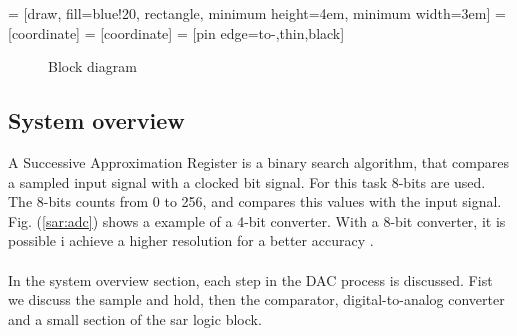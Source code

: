 \documentclass[english, 12pt, a4paper]{article}
\begin{document}
 = [draw, fill=blue!20, rectangle, 
    minimum height=4em, minimum width=3em]
 = [coordinate]
 = [coordinate]
 = [pin edge={to-,thin,black}]
\begin{figure}[!ht]
  \caption{Block diagram}
  \label{block_diagram}
\end{figure}
\subsection{System overview}
A Successive Approximation Register is a binary search algorithm, that compares a sampled input signal with a clocked bit signal. For this task 8-bits are used. The 8-bits counts from 0 to 256, and 
compares this values with the input signal. Fig. (\ref{sar:adc}) shows a example of a 4-bit converter. With a 8-bit converter, it is possible i achieve a higher resolution for a better accuracy \cite{sar-adc-concept}.\\
\\
In the system overview section, each step in the DAC process is discussed. Fist we discuss the sample and hold, then the comparator, digital-to-analog converter and a small section of 
the sar logic block. 
\end{document}

